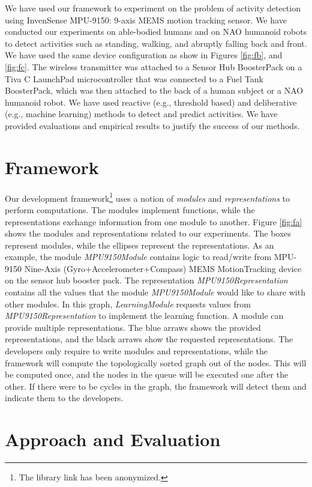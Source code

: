 \documentclass[letterpaper]{article}
\begin{document}
We have used our framework to experiment on the problem of activity detection using InvenSense 
MPU-9150: 9-axis MEMS motion tracking sensor. We have conducted our experiments on able-bodied 
humans and on NAO humanoid robots to detect activities such as standing, walking, and abruptly 
falling back and front. We have used the same device configuration as show in Figures \ref{fig:fb}, 
and \ref{fig:fc}. The wireless transmitter was attached to a Sensor Hub BoosterPack on a Tiva C 
LaunchPad microcontroller that was connected to a Fuel Tank BoosterPack, which was then attached to 
the back of a human subject or a NAO humanoid robot. We have used reactive (e.g., threshold based) 
and deliberative (e.g., machine learning) methods to detect and predict activities. We have 
provided  evaluations and empirical results to  justify the success of our methods. 


\section{Framework}

Our development framework\footnote{The library link has been anonymized.} uses a 
notion of 
{\em modules} and {\em representations} to perform
computations. The modules implement functions, while the representations exchange information from
one module to another. Figure \ref{fig:fa} shows the modules and representations related to our 
experiments. The boxes represent modules, while the ellipses represent the representations. As an
example, the module {\em MPU9150Module} contains logic to read/write from MPU-9150 Nine-Axis
(Gyro+Accelerometer+Compass) MEMS MotionTracking device on the sensor hub booster
pack. The representation {\em MPU9150Representation} contains all the values that the module
{\em MPU9150Module} would like to share with other modules. In this graph, {\em LearningModule}
requests values from {\em MPU9150Representation} to implement the learning function. A module can 
provide multiple representations. The blue arraws shows the provided representations, and the black 
arraws show the requested representations. The developers only require to write 
modules and representations, while the framework will compute the topologically sorted graph out of 
the nodes. This will be computed once, and the nodes in the queue will be executed one after the 
other. If there were to be cycles in the graph, the framework will detect them and indicate them to 
the developers.


\section{Approach and Evaluation}
\end{document}
